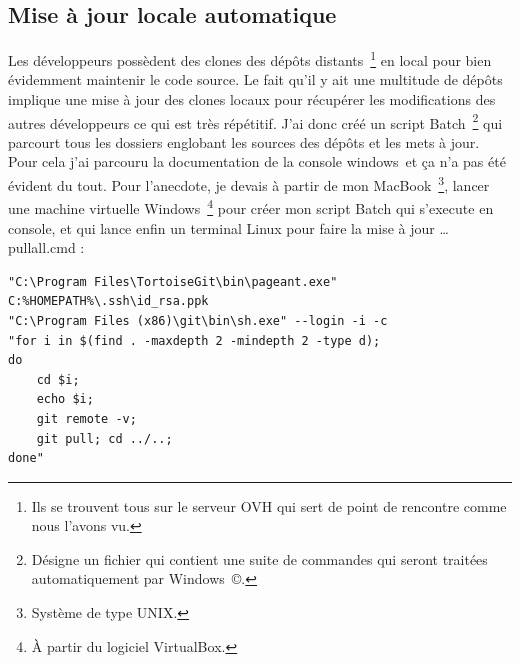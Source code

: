 
\subsection{Mise à jour locale automatique} %

Les développeurs possèdent des clones des dépôts distants\, \footnote{Ils se
trouvent tous sur le serveur OVH qui sert de point de rencontre comme nous
l'avons vu.} en local pour bien évidemment maintenir le code source. Le fait
qu'il y ait une multitude de dépôts implique une mise à jour des clones locaux
pour récupérer les modifications des autres développeurs ce qui est très
répétitif. J'ai donc créé un script Batch\, \footnote{Désigne un fichier qui
contient une suite de commandes qui seront traitées automatiquement par
Windows\, \copyright.} qui parcourt tous les dossiers englobant les sources des
dépôts et les mets à jour. Pour cela j'ai parcouru la documentation de la
console windows\, et ça n'a pas été évident du tout. Pour l'anecdote, je devais
à partir de mon MacBook\, \footnote{Système de type UNIX.}, lancer une machine
virtuelle Windows\, \footnote{À partir du logiciel VirtualBox.} pour créer mon
script Batch qui s'execute en console, et qui lance enfin un terminal Linux
pour faire la mise à jour \ldots{} \\

pullall.cmd :
\begin{lstlisting}
"C:\Program Files\TortoiseGit\bin\pageant.exe"
C:%HOMEPATH%\.ssh\id_rsa.ppk
"C:\Program Files (x86)\git\bin\sh.exe" --login -i -c
"for i in $(find . -maxdepth 2 -mindepth 2 -type d);
do
    cd $i;
    echo $i;
    git remote -v;
    git pull; cd ../..;
done"
\end{lstlisting}

\clearpage
